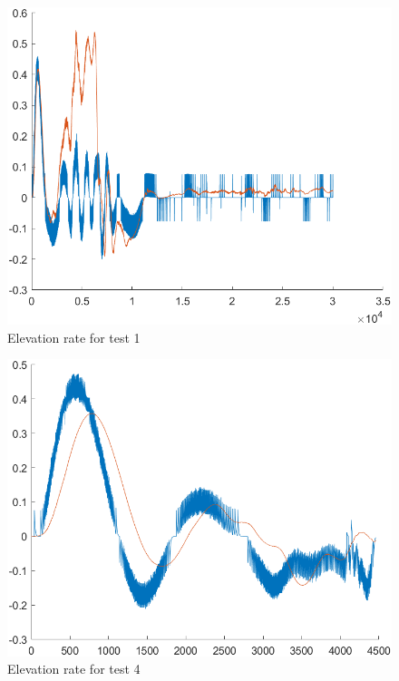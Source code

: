 \begin{figure}
    \centering
    \includegraphics[width=0.5\linewidth]{LabTest1(Blueberry).png}
    \caption{Elevation rate for test 1}
    \label{fig:enter-label}
\end{figure}
\begin{figure}
    \centering
    \includegraphics[width=0.5\linewidth]{LabTest4(Blueberry).png}
    \caption{Elevation rate for test 4}
    \label{fig:enter-label}
\end{figure}


